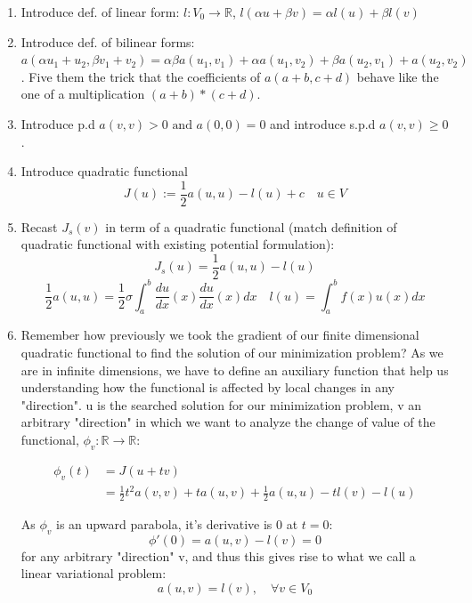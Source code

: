 \begin{enumerate}
\item Introduce def. of linear form: $l : V_0 \to \mathbb{R}$, $l(\alpha u + \beta v) = \alpha l(u) + \beta l(v)$

\item Introduce def. of bilinear forms: $a(\alpha u_1 + u_2, \beta v_1 + v_2 ) = \alpha \beta a(u_1, v_1) + \alpha a(u_1, v_2) + \beta a(u_2, v_1) + a(u_2, v_2)$. Five them the trick that the coefficients of $a(a+b, c+d)$ behave like the one of a multiplication $(a+b)*(c+d)$.
\item Introduce p.d $a(v,v) > 0 \text{ and } a(0, 0) = 0$ and introduce s.p.d $a(v,v) \geq 0$. 
\item Introduce quadratic functional $$J(u) := \frac{1}{2} a(u,u) - l(u) + c  \quad u \in V$$

\item Recast $J_s(v)$ in term of a quadratic functional (match definition of quadratic functional with existing potential formulation):
\begin{equation}
    J_s(u) = \frac{1}{2} a(u,u) - l(u)
\end{equation}
\begin{equation}
    \frac{1}{2} a(u,u) = \frac{1}{2}\sigma \int_a^b  \frac{du}{dx}(x)\frac{du}{dx}(x) dx \quad
    l(u) = \int_a^b f(x)u(x) dx
\end{equation}

\item Remember how previously we took the gradient of our finite dimensional quadratic functional to find the solution of our minimization problem? As we are in infinite dimensions, we have to define an auxiliary function that help us understanding how the functional is affected by local changes in any "direction". u is the searched solution for our minimization problem, v an arbitrary "direction" in which we want to analyze the change of value of the functional, $\phi_v : \mathbb{R} \rightarrow \mathbb{R}$:

\begin{equation}
\begin{aligned}
    \phi_v(t) &= J(u + tv) \\ &= \frac{1}{2}t^2a(v,v) + ta(u,v) + \frac{1}{2}a(u,u) - tl(v) - l(u)
\end{aligned}
\end{equation}

As $\phi_v$ is an upward parabola, it's derivative is 0 at $t=0$: $$\phi'(0) = a(u,v) - l(v) = 0$$ for any arbitrary "direction" v, and thus this gives rise to what we call a linear variational problem: $$a(u,v) = l(v), \quad \forall v \in V_0$$
\end{enumerate}


